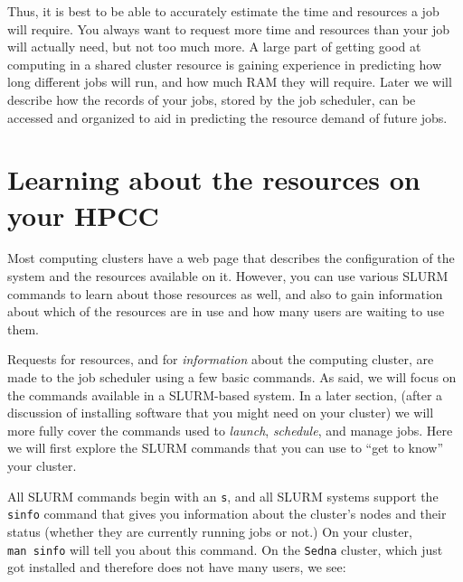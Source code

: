 \documentclass[]{krantz}
\makeatletter
\newenvironment{Shaded}{\begin{snugshade}}{\end{snugshade}}
\newcommand{\ExtensionTok}[1]{#1}
\newcommand{\NormalTok}[1]{#1}
\newenvironment{kframe}{%
\medskip{}
\setlength{\fboxsep}{.8em}
 \def\at@end@of@kframe{}%
 \ifinner\ifhmode%
  \def\at@end@of@kframe{\end{minipage}}%
  \begin{minipage}{\columnwidth}%
 \fi\fi%
 \def\FrameCommand##1{\hskip\@totalleftmargin \hskip-\fboxsep
 \colorbox{shadecolor}{##1}\hskip-\fboxsep
     \hskip-\linewidth \hskip-\@totalleftmargin \hskip\columnwidth}%
 \MakeFramed {\advance\hsize-\width
   \@totalleftmargin\z@ \linewidth\hsize
   \@setminipage}}%
 {\par\unskip\endMakeFramed%
 \at@end@of@kframe}
\renewenvironment{Shaded}{\begin{kframe}}{\end{kframe}}
\makeatother
\begin{document}
Thus, it is best to be able to accurately estimate the time and resources a job will
require. You always want to request more time and resources than your job will
actually need, but not too much more. A large part of getting good at computing
in a shared cluster resource is gaining experience in predicting how long different jobs will
run, and how much RAM they will require. Later we will describe how the records of your
jobs, stored by the job scheduler, can be accessed and organized to aid in predicting
the resource demand of future jobs.

\hypertarget{learning-about-the-resources-on-your-hpcc}{%
\section{Learning about the resources on your HPCC}\label{learning-about-the-resources-on-your-hpcc}}

Most computing clusters have a web page that describes the configuration of the system
and the resources available on it. However, you can use various SLURM commands to
learn about those resources as well, and also to gain information about which
of the resources are in use and how many users are waiting to use them.

Requests for resources, and for \emph{information} about the computing cluster, are made to the job scheduler
using a few basic commands. As said, we will focus on the commands available in a SLURM-based system.
In a later section, (after a discussion of installing software that you might need on your cluster)
we will more fully cover the commands used to \emph{launch}, \emph{schedule}, and manage jobs. Here
we will first explore the SLURM commands that
you can use to ``get to know'' your cluster.

All SLURM commands begin with an \texttt{s}, and all SLURM systems support the \texttt{sinfo} command
that gives you information about the cluster's nodes and their status (whether they are currently
running jobs or not.) On your cluster, \texttt{man\ sinfo} will tell you about this command.
On the \texttt{Sedna} cluster, which just got installed and therefore does not
have many users, we see:

\begin{Shaded}
\end{Shaded}
\end{document}
